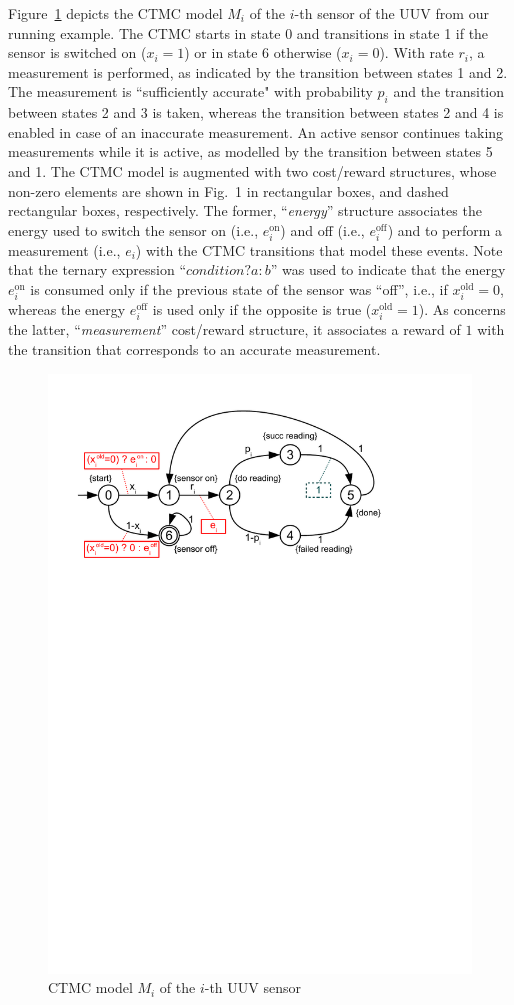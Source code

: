 \begin{example}
Figure~\ref{fig:model} depicts the CTMC model $M_i$ of the $i$-th sensor of the UUV from our running example. The CTMC starts in state 0 and transitions in state 1 if the sensor is switched on ($x_i=1$) or in state 6 otherwise ($x_i=0$). With rate $r_i$,  a measurement is performed, as indicated by the transition between states 1 and 2. The measurement is ``sufficiently accurate" with probability $p_i$ and the transition between states 2 and 3 is taken, whereas the transition between states 2 and 4 is enabled in case of an inaccurate measurement. An active sensor continues taking measurements while it is active,  as modelled by the transition between states 5 and 1. The CTMC model is augmented with two cost/reward structures, whose non-zero elements are shown in Fig.~1 in rectangular boxes, and dashed rectangular boxes, respectively. The former, ``\textit{energy}'' structure associates the energy used to switch the sensor on (i.e., $e_i^\mathrm{on}$) and off (i.e., $e_i^\mathrm{off}$) and to perform a measurement (i.e., $e_i$) with the CTMC transitions that model these events. Note that the ternary expression ``$\mathit{condition}?a\!:\!b$'' was used to indicate that the energy $e_i^\mathrm{on}$ is consumed only if the previous state of the sensor was ``off'', i.e., if $x_i^\mathrm{old}=0$, whereas the energy $e_i^\mathrm{off}$ is used  only if the opposite is true ($x_i^\mathrm{old}=1$). As concerns the latter, ``\textit{measurement}'' cost/reward structure, it associates a reward of $1$ with the transition that corresponds to an accurate measurement. 

\begin{figure}[t]
\centering 
\includegraphics[trim = 17mm 205mm 45mm 17mm, clip, width=0.7\linewidth]{figures/model.pdf}
\caption{CTMC model $M_i$ of the $i$-th UUV sensor}
\label{fig:model}

\vspace*{-2mm}
\end{figure}


\end{example}
